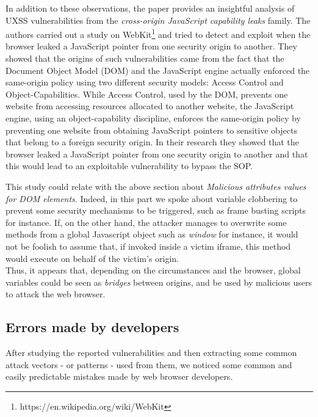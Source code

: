 \documentclass[journal]{IEEEtran}
\begin{document}
\bigskip

In addition to these observations, the \cite{uxssJSLeaks} paper provides an insightful analysis of UXSS vulnerabilities from the \emph{cross-origin JavaScript capability leaks} family. The authors carried out a study on WebKit\footnote{https://en.wikipedia.org/wiki/WebKit} and tried to detect and exploit when the browser leaked a JavaScript pointer from one security origin to another. They showed that the origins of such vulnerabilities came from the fact that the Document Object Model (DOM) and the JavaScript engine actually enforced the same-origin policy using two different security models: Access Control and Object-Capabilities. While Access Control, used by the DOM, prevents one website from accessing resources allocated to another website, the JavaScript engine, using an object-capability discipline, enforces the same-origin policy by preventing one website from obtaining JavaScript pointers to sensitive objects that belong to a foreign security origin. In their research they showed that the browser leaked a JavaScript pointer from one security origin to another and that this would lead to an exploitable vulnerability to bypass the SOP.

\medskip

This study could relate with the above section about \emph{Malicious attributes values for DOM elements}. Indeed, in this part we spoke about variable clobbering to prevent some security mechanisms to be triggered, such as frame busting scripts for instance. If, on the other hand, the attacker manages to overwrite some methods from a global Javascript object such as \emph{window} for instance, it would not be foolish to assume that, if invoked inside a victim iframe, this method would execute on behalf of the victim's origin. \\

Thus, it appears that, depending on the circumstances and the browser, global variables could be seen as \emph{bridges} between origins, and be used by malicious users to attack the web browser.


\subsection{Errors made by developers}

After studying the reported vulnerabilities and then extracting some common attack vectors - or patterns - used from them, we noticed some common and easily predictable mistakes made by web browser developers.
\end{document}

